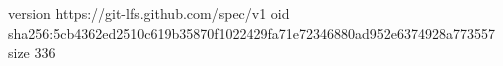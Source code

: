 version https://git-lfs.github.com/spec/v1
oid sha256:5cb4362ed2510c619b35870f1022429fa71e72346880ad952e6374928a773557
size 336
